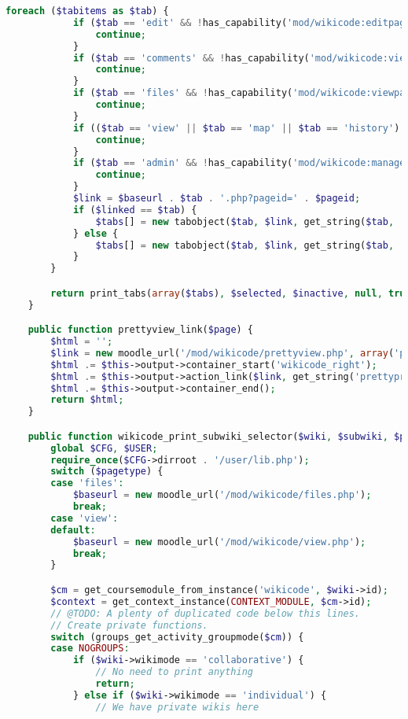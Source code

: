 \begin{lstlisting}[language=PHP]
        foreach ($tabitems as $tab) {
            if ($tab == 'edit' && !has_capability('mod/wikicode:editpage', $context)) {
                continue;
            }
            if ($tab == 'comments' && !has_capability('mod/wikicode:viewcomment', $context)) {
                continue;
            }
            if ($tab == 'files' && !has_capability('mod/wikicode:viewpage', $context)) {
                continue;
            }
            if (($tab == 'view' || $tab == 'map' || $tab == 'history') && !has_capability('mod/wikicode:viewpage', $context)) {
                continue;
            }
            if ($tab == 'admin' && !has_capability('mod/wikicode:managewiki', $context)) {
                continue;
            }
            $link = $baseurl . $tab . '.php?pageid=' . $pageid;
            if ($linked == $tab) {
                $tabs[] = new tabobject($tab, $link, get_string($tab, 'wikicode'), '', true);
            } else {
                $tabs[] = new tabobject($tab, $link, get_string($tab, 'wikicode'));
            }
        }

        return print_tabs(array($tabs), $selected, $inactive, null, true);
    }

    public function prettyview_link($page) {
        $html = '';
        $link = new moodle_url('/mod/wikicode/prettyview.php', array('pageid' => $page->id));
        $html .= $this->output->container_start('wikicode_right');
        $html .= $this->output->action_link($link, get_string('prettyprint', 'wikicode'), new popup_action('click', $link));
        $html .= $this->output->container_end();
        return $html;
    }

    public function wikicode_print_subwiki_selector($wiki, $subwiki, $page, $pagetype = 'view') {
        global $CFG, $USER;
        require_once($CFG->dirroot . '/user/lib.php');
        switch ($pagetype) {
        case 'files':
            $baseurl = new moodle_url('/mod/wikicode/files.php');
            break;
        case 'view':
        default:
            $baseurl = new moodle_url('/mod/wikicode/view.php');
            break;
        }

        $cm = get_coursemodule_from_instance('wikicode', $wiki->id);
        $context = get_context_instance(CONTEXT_MODULE, $cm->id);
        // @TODO: A plenty of duplicated code below this lines.
        // Create private functions.
        switch (groups_get_activity_groupmode($cm)) {
        case NOGROUPS:
            if ($wiki->wikimode == 'collaborative') {
                // No need to print anything
                return;
            } else if ($wiki->wikimode == 'individual') {
                // We have private wikis here


\end{lstlisting}
